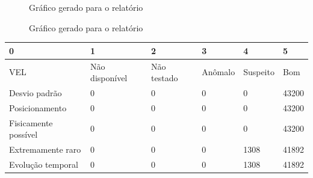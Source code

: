 \documentclass{article}
\begin{document}
\begin{figure}[h!]
\centering
{}
\caption{Gráfico gerado para o relatório}
\end{figure}

\newpage

\begin{figure}[h!]
\centering
{}
\caption{Gráfico gerado para o relatório}
\end{figure}

\newpage

\begin{tabular}{llllll}
\hline
 0                    & 1              & 2           & 3       & 4        & 5     \\
\hline
 VEL                  & Não disponível & Não testado & Anômalo & Suspeito & Bom   \\
 Desvio padrão        & 0              & 0           & 0       & 0        & 43200 \\
 Posicionamento       & 0              & 0           & 0       & 0        & 43200 \\
 Fisicamente possível & 0              & 0           & 0       & 0        & 43200 \\
 Extremamente raro    & 0              & 0           & 0       & 1308     & 41892 \\
 Evolução temporal    & 0              & 0           & 0       & 1308     & 41892 \\
\hline
\end{tabular}
\newpage
\end{document}

